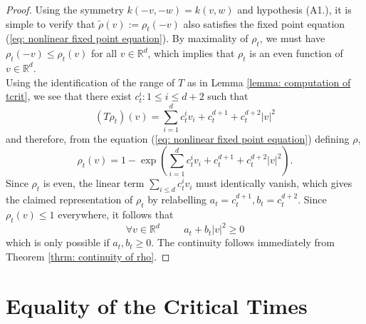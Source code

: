 \documentclass[11pt, notitlepage]{article}
\begin{document}
\begin{proof} Using the symmetry $k(-v,-w)=k(v,w)$ and hypothesis ({A1}.), it is simple to verify that $\tilde{\rho}(v):=\rho_t(-v)$ also satisfies the fixed point equation (\ref{eq: nonlinear fixed point equation}). By maximality of $\rho_t$, we must have $\rho_t(-v)\le \rho_t(v)$ for all $v\in \mathbb{R}^d$, which implies that $\rho_t$ is an even function of $v\in\mathbb{R}^d$. \medskip \\ Using the identification of the range of $T$ as in Lemma \ref{lemma: computation of tcrit}, we see that there exist $c^i_t: 1\le i\le d+2$ such that \begin{equation}
    (T\rho_t)(v)=\sum_{i=1}^d c^i_t v_i+ c^{d+1}_t +c^{d+2}_t|v|^2
\end{equation}and therefore, from the equation (\ref{eq: nonlinear fixed point equation}) defining $\rho$, \begin{equation}
    \rho_t(v)=1-\exp\left(\sum_{i=1}^d c^i_t v_i+ c^{d+1}_t +c^{d+2}_t|v|^2\right).
\end{equation} Since $\rho_t$ is even, the linear term $\sum_{i\le d} c^i_t v_i$ must identically vanish, which gives the claimed representation of $\rho_t$ by relabelling $a_t=c^{d+1}_t, b_t=c^{d+2}_t$. Since $\rho_t(v)\le 1$ everywhere, it follows that \begin{equation}
   \forall v \in \mathbb{R}^d\hspace{1cm} a_t+b_t|v|^2 \ge 0
\end{equation}which is only possible if $a_t, b_t\ge 0.$ The continuity follows immediately from Theorem \ref{thrm: continuity of rho}. \end{proof} 

\section{\textbf{Equality of the Critical Times}} \label{sec: ECT}
\end{document}
